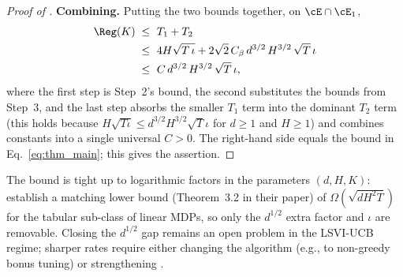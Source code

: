 \begin{proof}[Proof of ]
\smallskip\noindent
\textbf{Combining.} Putting the two bounds together, on $\cE \cap \cE_1$,
\begin{align*}
\Reg(K)
\;\le\; & ~ T_1 + T_2 \\
\;\le\; & ~ 4 H \sqrt{T \,\iota} + 2 \sqrt{2}\, C_\beta\, d^{3/2}\, H^{3/2}\, \sqrt{T}\, \iota \\
\;\le\; & ~ C\, d^{3/2}\, H^{3/2}\, \sqrt{T}\, \iota,
\end{align*}
where the first step is Step~2's bound, the second substitutes the bounds from Step~3, and the last step absorbs the smaller $T_1$ term into the dominant $T_2$ term (this holds because $H \sqrt{T\iota} \le d^{3/2} H^{3/2} \sqrt T \iota$ for $d \ge 1$ and $H \ge 1$) and combines constants into a single universal $C > 0$. The right-hand side equals the bound in Eq.~\eqref{eq:thm_main}; this gives the assertion.
\end{proof}

\begin{remark}\label{rem:tightness}
The bound is tight up to logarithmic factors in the parameters $(d, H, K)$: \cite{jin2020provably} establish a matching lower bound (Theorem~3.2 in their paper) of $\Omega(\sqrt{d H^2 T})$ for the tabular sub-class of linear MDPs, so only the $d^{1/2}$ extra factor and $\iota$ are removable. Closing the $d^{1/2}$ gap remains an open problem in the LSVI-UCB regime; sharper rates require either changing the algorithm (e.g., to non-greedy bonus tuning) or strengthening .
\end{remark}
